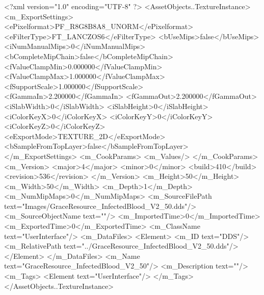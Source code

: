 <?xml version="1.0" encoding="UTF-8" ?>
<AssetObjects..TextureInstance>
	<m_ExportSettings>
		<ePixelformat>PF_R8G8B8A8_UNORM</ePixelformat>
		<eFilterType>FT_LANCZOS6</eFilterType>
		<bUseMips>false</bUseMips>
		<iNumManualMips>0</iNumManualMips>
		<bCompleteMipChain>false</bCompleteMipChain>
		<fValueClampMin>0.000000</fValueClampMin>
		<fValueClampMax>1.000000</fValueClampMax>
		<fSupportScale>1.000000</fSupportScale>
		<fGammaIn>2.200000</fGammaIn>
		<fGammaOut>2.200000</fGammaOut>
		<iSlabWidth>0</iSlabWidth>
		<iSlabHeight>0</iSlabHeight>
		<iColorKeyX>0</iColorKeyX>
		<iColorKeyY>0</iColorKeyY>
		<iColorKeyZ>0</iColorKeyZ>
		<eExportMode>TEXTURE_2D</eExportMode>
		<bSampleFromTopLayer>false</bSampleFromTopLayer>
	</m_ExportSettings>
	<m_CookParams>
		<m_Values/>
	</m_CookParams>
	<m_Version>
		<major>4</major>
		<minor>0</minor>
		<build>410</build>
		<revision>536</revision>
	</m_Version>
	<m_Height>50</m_Height>
	<m_Width>50</m_Width>
	<m_Depth>1</m_Depth>
	<m_NumMipMaps>0</m_NumMipMaps>
	<m_SourceFilePath text="Images/GraceResource_InfectedBlood_V2_50.dds"/>
	<m_SourceObjectName text=""/>
	<m_ImportedTime>0</m_ImportedTime>
	<m_ExportedTime>0</m_ExportedTime>
	<m_ClassName text="UserInterface"/>
	<m_DataFiles>
		<Element>
			<m_ID text="DDS"/>
			<m_RelativePath text="../GraceResource_InfectedBlood_V2_50.dds"/>
		</Element>
	</m_DataFiles>
	<m_Name text="GraceResource_InfectedBlood_V2_50"/>
	<m_Description text=""/>
	<m_Tags>
		<Element text="UserInterface"/>
	</m_Tags>
</AssetObjects..TextureInstance>
